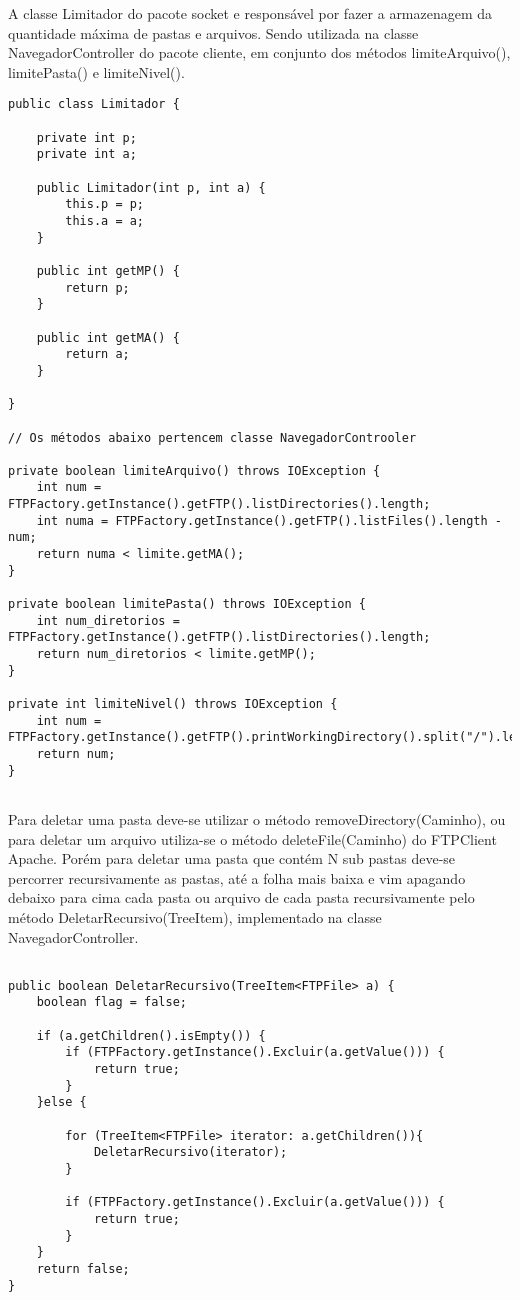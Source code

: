\documentclass[12pt]{article}
\begin{document}
A classe Limitador do pacote socket e responsável por fazer a armazenagem da quantidade máxima de pastas e arquivos. Sendo utilizada na classe NavegadorController do pacote cliente, em conjunto dos métodos limiteArquivo(), limitePasta()  e limiteNivel().
 
 \begin{lstlisting}
public class Limitador {

	private int p;
	private int a;
	
	public Limitador(int p, int a) {
		this.p = p;
		this.a = a;
	}
	
	public int getMP() {
		return p;
	}
	
	public int getMA() {
		return a;
	}

}

// Os métodos abaixo pertencem classe NavegadorControoler

private boolean limiteArquivo() throws IOException {
	int num = FTPFactory.getInstance().getFTP().listDirectories().length;
	int numa = FTPFactory.getInstance().getFTP().listFiles().length - num;
	return numa < limite.getMA();
}

private boolean limitePasta() throws IOException {
	int num_diretorios = FTPFactory.getInstance().getFTP().listDirectories().length;
	return num_diretorios < limite.getMP();
}

private int limiteNivel() throws IOException {
	int num = FTPFactory.getInstance().getFTP().printWorkingDirectory().split("/").length;
	return num;
}


\end{lstlisting}
	Para deletar uma pasta deve-se utilizar o método removeDirectory(Caminho), ou para deletar um arquivo utiliza-se o método deleteFile(Caminho) do FTPClient Apache. Porém para deletar uma pasta que contém N sub pastas deve-se percorrer recursivamente as pastas, até a folha mais baixa e vim apagando debaixo para cima cada pasta ou arquivo de cada pasta recursivamente pelo método DeletarRecursivo(TreeItem), implementado na classe NavegadorController.  
\begin{lstlisting}

public boolean DeletarRecursivo(TreeItem<FTPFile> a) {
	boolean flag = false;
	
	if (a.getChildren().isEmpty()) {
		if (FTPFactory.getInstance().Excluir(a.getValue())) {
			return true;
		}
	}else {
	
		for (TreeItem<FTPFile> iterator: a.getChildren()){
			DeletarRecursivo(iterator);
		}
		
		if (FTPFactory.getInstance().Excluir(a.getValue())) {
			return true;
		}
	}
	return false;
}
\end{lstlisting}
\end{document}
